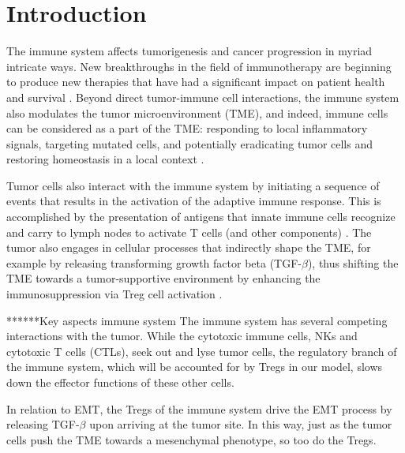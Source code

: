 \documentclass[11pt, preprint]{article}
\begin{document}
\section{Introduction}
The immune system affects tumorigenesis and cancer progression in myriad intricate ways. New breakthroughs in the field of immunotherapy are beginning to produce new therapies that have had a significant impact on patient health and survival \cite{pardoll2012blockade,restifo2012adoptive}. Beyond direct tumor-immune cell interactions, the immune system also modulates the tumor microenvironment (TME), and indeed, immune cells can be considered as a part of the TME: responding to local inflammatory signals, targeting mutated cells, and potentially eradicating tumor cells and restoring homeostasis in a local context \cite{de2006paradoxical}.
\par 
Tumor cells also interact with the immune system by initiating a sequence of events that results in the activation of the adaptive immune response. This is accomplished by the presentation of antigens that innate immune cells recognize and carry to lymph nodes to activate T cells (and other components) \cite{schreiber11_cancer}. The tumor also engages in cellular processes that indirectly shape the TME, for example by releasing transforming growth factor beta (TGF-$\beta$), thus shifting the TME towards a tumor-supportive environment by enhancing the immunosuppression via Treg cell activation \cite{schreiber11_cancer}.



******Key aspects immune system
%
The immune system has several competing interactions with the tumor.
While the cytotoxic immune cells, NKs and cytotoxic T cells (CTLs), seek out and lyse tumor cells, the regulatory branch of the immune system, which will be accounted for by Tregs in our model, slows down the effector functions of these other cells. %

In relation to EMT, the Tregs of the immune system drive the EMT process by releasing TGF-$\beta$ upon arriving at the tumor site\cite{terry2017new}.
In this way, just as the tumor cells push the TME towards a mesenchymal phenotype, so too do the Tregs.
\end{document}
